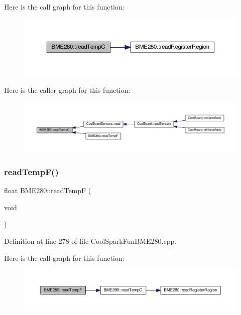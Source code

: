 Here is the call graph for this function\+:
\nopagebreak
\begin{figure}[H]
\begin{center}
\leavevmode
\includegraphics[width=350pt]{class_b_m_e280_afffdd1d7ded9e1f92200e70669019d97_cgraph}
\end{center}
\end{figure}
Here is the caller graph for this function\+:
\nopagebreak
\begin{figure}[H]
\begin{center}
\leavevmode
\includegraphics[width=350pt]{class_b_m_e280_afffdd1d7ded9e1f92200e70669019d97_icgraph}
\end{center}
\end{figure}
\mbox{\label{class_b_m_e280_a9648b496f6b4700550782a715a98b3c7}} 
\subsubsection{\texorpdfstring{read\+Temp\+F()}{readTempF()}}
{\footnotesize\ttfamily float B\+M\+E280\+::read\+TempF (\begin{DoxyParamCaption}\item[{void}]{ }\end{DoxyParamCaption})}



Definition at line 278 of file Cool\+Spark\+Fun\+B\+M\+E280.\+cpp.

Here is the call graph for this function\+:
\nopagebreak
\begin{figure}[H]
\begin{center}
\leavevmode
\includegraphics[width=350pt]{class_b_m_e280_a9648b496f6b4700550782a715a98b3c7_cgraph}
\end{center}
\end{figure}
\mbox{\label{class_b_m_e280_aeec5deb6daace6ae390108b4210e9df7}} 
